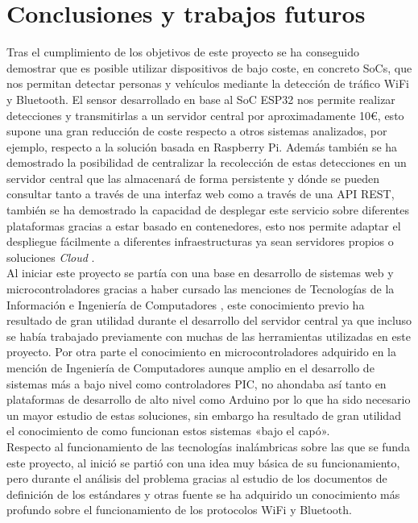 \documentclass[../proyecto.tex]{subfiles}
\begin{document}
\chapter{Conclusiones y trabajos futuros}

Tras el cumplimiento de los objetivos de este proyecto se ha conseguido demostrar que es posible utilizar dispositivos de bajo coste, en concreto SoCs, que nos permitan detectar personas y vehículos mediante la detección de tráfico WiFi y Bluetooth. El sensor desarrollado en base al SoC ESP32 nos permite realizar detecciones y transmitirlas a un servidor central por aproximadamente 10€, esto supone una gran reducción de coste respecto a otros sistemas analizados, por ejemplo, respecto a la solución basada en Raspberry Pi. Además también se ha demostrado la posibilidad de centralizar la recolección de estas detecciones en un servidor central que las almacenará de forma persistente y dónde se pueden consultar tanto a través de una interfaz web como a través de una API REST, también se ha demostrado la capacidad de desplegar este servicio sobre diferentes plataformas gracias a estar basado en contenedores, esto nos permite adaptar el despliegue fácilmente a diferentes infraestructuras ya sean servidores propios o soluciones \textit{Cloud} .\\

Al iniciar este proyecto se partía con una base en desarrollo de sistemas web y microcontroladores gracias a haber cursado las menciones de Tecnologías de la Información e Ingeniería de Computadores , este conocimiento previo ha resultado de gran utilidad durante el desarrollo del servidor central ya que incluso se había trabajado previamente con muchas de las herramientas utilizadas en este proyecto. Por otra parte el conocimiento en microcontroladores adquirido en la mención de Ingeniería de Computadores aunque amplio en el desarrollo de sistemas más a bajo nivel como controladores PIC,  no ahondaba así tanto en plataformas de desarrollo de alto nivel como Arduino por lo que ha sido necesario un mayor estudio de estas soluciones, sin embargo ha resultado de gran utilidad el conocimiento de como funcionan estos sistemas «bajo el capó». \\

Respecto al funcionamiento de las tecnologías inalámbricas sobre las que se funda este proyecto, al inició se partió con una idea muy básica de su funcionamiento, pero durante el análisis del problema gracias al estudio de los documentos de definición de los estándares y otras fuente se ha adquirido un conocimiento más profundo sobre el funcionamiento de los protocolos WiFi y Bluetooth.\\
\end{document}
